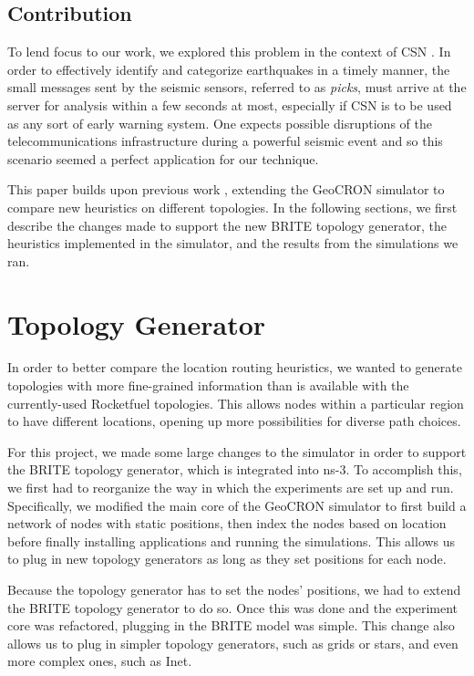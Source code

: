 \documentclass[conference]{IEEEtran}
\begin{document}
\subsection{Contribution}
To lend focus to our work, we explored this problem in the context of CSN \cite{csn_site}.
In order to effectively identify and categorize earthquakes in a timely manner, the small messages sent by the seismic sensors, referred to as \emph{picks}, must arrive at the server for analysis within a few seconds at most, especially if CSN is to be used as any sort of early warning system.
One expects possible disruptions of the telecommunications infrastructure during a powerful seismic event and so this scenario seemed a perfect application for our technique.

This paper builds upon previous work \cite{Benson2013}, extending the GeoCRON simulator to compare new heuristics on different topologies.
In the following sections, we first describe the changes made to support the new BRITE topology generator, the heuristics implemented in the simulator, and the results from the simulations we ran.


\section{Topology Generator}

In order to better compare the location routing heuristics, we wanted to generate topologies with more fine-grained information than is available with the currently-used Rocketfuel topologies.
This allows nodes within a particular region to have different locations, opening up more possibilities for diverse path choices.

For this project, we made some large changes to the simulator in order to support the BRITE topology generator, which is integrated into ns-3.
To accomplish this, we first had to reorganize the way in which the experiments are set up and run.
Specifically, we modified the main core of the GeoCRON simulator to first build a network of nodes with static positions, then index the nodes based on location before finally installing applications and running the simulations.
This allows us to plug in new topology generators as long as they set positions for each node.

Because the topology generator has to set the nodes' positions, we had to extend the BRITE topology generator to do so.
Once this was done and the experiment core was refactored, plugging in the BRITE model was simple.
This change also allows us to plug in simpler topology generators, such as grids or stars, and even more complex ones, such as Inet.
\end{document}

